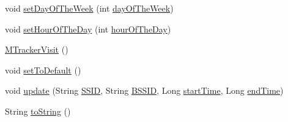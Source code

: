 \begin{DoxyCompactItemize}
\item 
void \hyperlink{classeu_1_1uloop_1_1mobilitytracker_1_1MTrackerVisit_acd58e52bb1101fe939c2937cea6a0b6f}{set\+Day\+Of\+The\+Week} (int \hyperlink{classeu_1_1uloop_1_1mobilitytracker_1_1MTrackerVisit_a0618cd50658edf1edbb32f38cd167c3d}{day\+Of\+The\+Week})
\item 
void \hyperlink{classeu_1_1uloop_1_1mobilitytracker_1_1MTrackerVisit_a066e80b5273b42b9434d8bdbe82e47b3}{set\+Hour\+Of\+The\+Day} (int \hyperlink{classeu_1_1uloop_1_1mobilitytracker_1_1MTrackerVisit_a7bc1898c9ce63142f39c82e85f744d91}{hour\+Of\+The\+Day})
\item 
\hyperlink{classeu_1_1uloop_1_1mobilitytracker_1_1MTrackerVisit_a3cd3e33db8463ca8c2f75a5531abaeb4}{M\+Tracker\+Visit} ()
\item 
void \hyperlink{classeu_1_1uloop_1_1mobilitytracker_1_1MTrackerVisit_acb6e24ed255d13fd93443ab41e4e4a8d}{set\+To\+Default} ()
\item 
void \hyperlink{classeu_1_1uloop_1_1mobilitytracker_1_1MTrackerVisit_abdb50e593bbecf743f438a03fe8fb265}{update} (String \hyperlink{classeu_1_1uloop_1_1mobilitytracker_1_1MTrackerVisit_a2b06a1d0005df091b2251bca6e6c0246}{S\+S\+I\+D}, String \hyperlink{classeu_1_1uloop_1_1mobilitytracker_1_1MTrackerVisit_a11a058f787db9cf1d022e18a4540f299}{B\+S\+S\+I\+D}, Long \hyperlink{classeu_1_1uloop_1_1mobilitytracker_1_1MTrackerVisit_ae176a1cf5c83af3b438c6d5f1afc6e52}{start\+Time}, Long \hyperlink{classeu_1_1uloop_1_1mobilitytracker_1_1MTrackerVisit_a784e03ea2ea0ef6d31b6bf9ee2b4ed86}{end\+Time})
\item 
String \hyperlink{classeu_1_1uloop_1_1mobilitytracker_1_1MTrackerVisit_a2c6cee8ad1423500709f2b41424769ac}{to\+String} ()
\end{DoxyCompactItemize}
